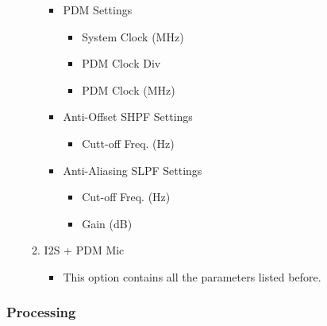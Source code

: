 \begin{itemize}
\begin{enumerate}
                \begin{itemize}
                    \item PDM Settings
                        \begin{itemize}
                            \item System Clock (MHz)
                            \item PDM Clock Div
                            \item PDM Clock (MHz)
                        \end{itemize}
                    \item Anti-Offset SHPF Settings
                        \begin{itemize}
                            \item Cutt-off Freq. (Hz)
                        \end{itemize}
                    \item Anti-Aliasing SLPF Settings
                        \begin{itemize}
                            \item Cut-off Freq. (Hz)
                            \item Gain (dB)
                        \end{itemize}
                \end{itemize}
            \item I2S + PDM Mic
                \begin{itemize}
                    \item This option contains all the parameters listed before.
                \end{itemize}
        \end{enumerate}
\end{itemize}


\subsubsection{Processing}

